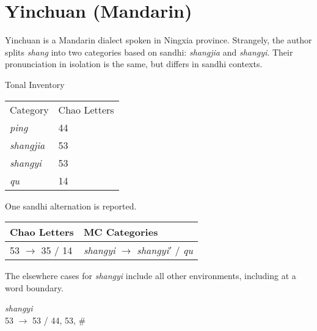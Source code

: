 \documentclass{article}
\begin{document}
\section{Yinchuan (Mandarin)}
Yinchuan is a Mandarin dialect spoken in Ningxia province.\cite{Zhang1984} Strangely, the author splits \textit{shang} into two categories based on sandhi: \textit{shangjia} and \textit{shangyi}. Their pronunciation in isolation is the same, but differs in sandhi contexts.
\begin{exe}
\ex Tonal Inventory \\
\begin{tabular}[t]{|ll|}
\hline
Category & Chao Letters \\
\textit{ping} & 44 \\
\textit{shangjia} & 53 \\
\textit{shangyi} & 53 \\
\textit{qu} &  14 \\
\hline
\end{tabular}
\end{exe}
One sandhi alternation is reported.
\begin{exe}
\ex
\begin{tabular}[t]{ll}
Chao Letters & MC Categories \\
\hline
53 $\rightarrow$ 35 / \underline{\hspace{1em}} 14 & \textit{shangyi} $\rightarrow$ \textit{shangyi}$'$ / \underline{\hspace{1em}} \textit{qu} \\ 
\end{tabular}
\end{exe}
The elsewhere cases for \textit{shangyi} include all other environments, including at a word boundary.
\begin{exe}
\ex 
\begin{xlist}
\ex \textit{shangyi} \\
53 $\rightarrow$ 53 / \underline{\hspace{1em}} 44, 53, \#
\end{xlist}
\end{exe}
\end{document}
